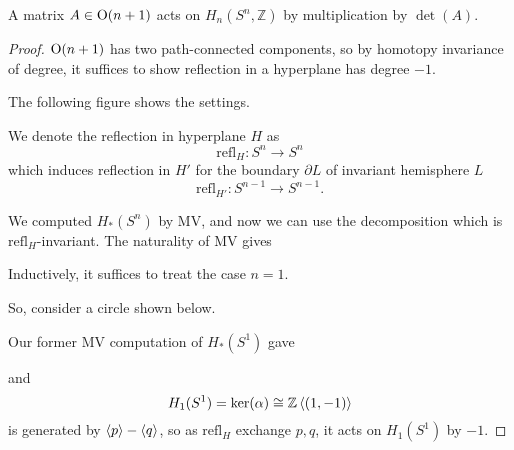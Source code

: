 \documentclass[a4paper,11pt]{article}
\begin{document}
	\begin{lem}
		A matrix $A \in \operatorname{O}(n+1)$ acts on $H_n(S^n, \mathbb{Z})$ by multiplication by $\det (A)$.
	\end{lem}
	\begin{proof}
		$\operatorname{O}(n+1)$ has two path-connected components, so by homotopy invariance of degree, it suffices to show reflection in a hyperplane has degree $-1$.

		The following figure shows the settings.


		We denote the reflection in hyperplane $H$ as
		\[
			\text{refl}_H : S^n \to S^n
		\]
		which induces reflection in $H'$ for the boundary $\partial L$ of invariant hemisphere $L$
		\[
			\text{refl}_{H'} : S ^{n-1} \to S ^{n-1}.
		\]
		
		We computed $H_*(S^n)$ by MV, and now we can use the decomposition which is $\text{refl}_H$-invariant. The naturality of MV gives
		\begin{center}
		\end{center}

		Inductively, it suffices to treat the case $n=1$.

		So, consider a circle shown below.


		Our former MV computation of $H_*(S^1)$ gave
		\begin{center}
		\end{center}
		and
		\[
			H_1(S^1) = \ker(\alpha) \cong \mathbb{Z}\expval{(1,-1)}
		\]
		is generated by $\expval{p} - \expval{q}$, so as $\text{refl}_H$ exchange $p,q$, it acts on $H_1(S^1)$ by $-1$.
	\end{proof}
\end{document}
